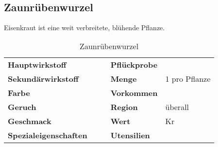 \subsection{Zaunrübenwurzel}
Eisenkraut ist eine weit verbreitete, blühende Pflanze. 

\begin{table}[h]
\begin{center}
\begin{tabular}{|l|l|p{1cm}|l|l|}
	\cline{1-2} \cline{4-5}
	\textbf{Hauptwirkstoff} &  && \textbf{Pflückprobe} &  \\ \cline{1-2} \cline{4-5}
	\textbf{Sekundärwirkstoff} &  && \textbf{Menge} & 1 pro Pflanze \\ \cline{1-2} \cline{4-5}
	\textbf{Farbe} &  && \textbf{Vorkommen} &  \\ \cline{1-2} \cline{4-5}
	\textbf{Geruch} &  && \textbf{Region} & überall \\ \cline{1-2} \cline{4-5}
	\textbf{Geschmack} &  && \textbf{Wert} & Kr \\ \cline{1-2} \cline{4-5}
	\textbf{Spezialeigenschaften} &  && \textbf{Utensilien} &  \\ \cline{1-2} \cline{4-5}
\end{tabular}
\end{center}
\caption{Zaunrübenwurzel}
\label{tab:zaunruebenwurzel}
\end{table}
